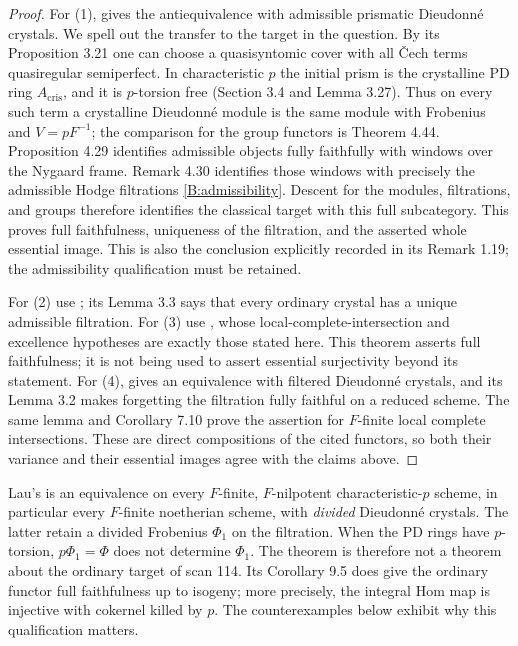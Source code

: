 \begin{proof}
For (1), \cite[Theorem 4.74]{B:ALB} gives the antiequivalence with
admissible prismatic Dieudonn\'e crystals. We spell out the transfer
to the target in the question. By its Proposition 3.21 one can choose
a quasisyntomic cover with all \v Cech terms quasiregular semiperfect.
In characteristic $p$ the initial prism is the crystalline PD ring
$A_{\mathrm{cris}}$, and it is $p$-torsion free
(Section 3.4 and Lemma 3.27). Thus on every such term a crystalline
Dieudonn\'e module is the same module with Frobenius and
$V=pF^{-1}$; the comparison for the group functors is Theorem 4.44.
Proposition 4.29 identifies admissible objects fully faithfully with
windows over the Nygaard frame. Remark 4.30 identifies those windows
with precisely the admissible Hodge filtrations
\eqref{B:admissibility}. Descent for the modules, filtrations, and
groups therefore identifies the classical target with this full
subcategory. This proves full faithfulness, uniqueness of the
filtration, and the asserted whole essential image. This is also
the conclusion explicitly recorded in its Remark 1.19; the
admissibility qualification must be retained.

For (2) use \cite[Theorem 7.6]{B:LauDivided}; its Lemma 3.3 says
that every ordinary crystal has a unique admissible filtration.
For (3) use \cite[Theorem 4.6]{B:deJongMessing1999}, whose
local-complete-intersection and excellence hypotheses are exactly
those stated here. This theorem asserts full faithfulness; it is
not being used to assert essential surjectivity beyond its statement.
For (4), \cite[Theorem 7.9]{B:LauDivided} gives an equivalence with
filtered Dieudonn\'e crystals, and its Lemma 3.2 makes forgetting
the filtration fully faithful on a reduced scheme. The same lemma
and Corollary 7.10 prove the assertion for $F$-finite local complete
intersections. These are direct compositions of the cited functors,
so both their variance and their essential images agree with the
claims above.
\end{proof}

\begin{remark}
\label{B:divided-target}
Lau's \cite[Theorem 9.3]{B:LauDivided} is an equivalence on every
$F$-finite, $F$-nilpotent characteristic-$p$ scheme, in particular
every $F$-finite noetherian scheme, with \emph{divided} Dieudonn\'e
crystals. The latter retain a divided Frobenius $\Phi_1$ on the
filtration. When the PD rings have $p$-torsion, $p\Phi_1=\Phi$ does
not determine $\Phi_1$. The theorem is therefore not a theorem about
the ordinary target of scan 114. Its Corollary 9.5 does give the
ordinary functor full faithfulness up to isogeny; more precisely,
the integral Hom map is injective with cokernel killed by $p$.
The counterexamples below exhibit why this qualification matters.
\end{remark}

